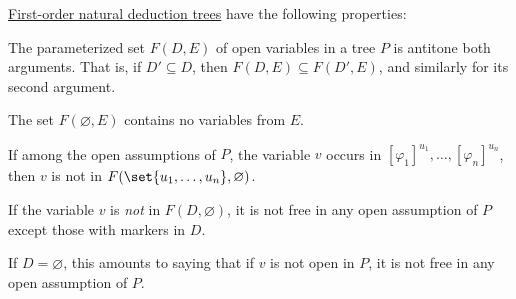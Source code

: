 \begin{proposition}\label{thm:def:fol_natural_deduction_proof_tree}
  \hyperref[def:fol_natural_deduction_proof_tree]{First-order natural deduction trees} have the following properties:
  \begin{thmenum}
     The parameterized set \( F(D, E) \) of open variables in a tree \( P \) is antitone both arguments. That is, if \( D' \subseteq D \), then \( F(D, E) \subseteq F(D', E) \), and similarly for its second argument.

     The set \( F(\varnothing, E) \) contains no variables from \( E \).

     If among the open assumptions of \( P \), the variable \( v \) occurs in \( [\varphi_1]^{u_1}, \ldots, [\varphi_n]^{u_n} \), then \( v \) is not in \( F(\set{ u_1, \ldots, u_n }, \varnothing) \).

     If the variable \( v \) is \emph{not} in \( F(D, \varnothing) \), it is not free in any open assumption of \( P \) except those with markers in \( D \).

    If \( D = \varnothing \), this amounts to saying that if \( v \) is not open in \( P \), it is not free in any open assumption of \( P \).
  \end{thmenum}
\end{proposition}
